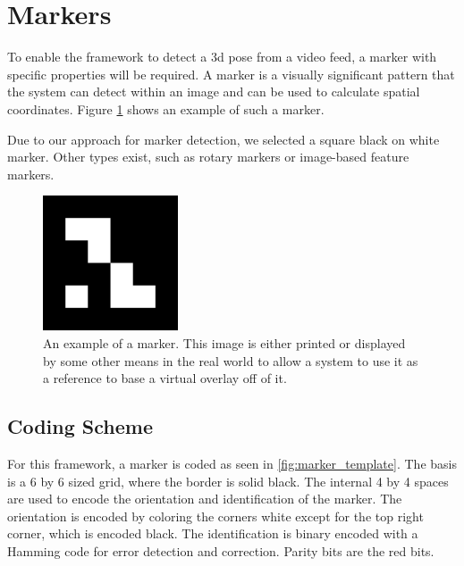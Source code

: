 \section{Markers}
\label{section_markers}

To enable the framework to detect a 3d pose from a video feed, a marker with specific properties will be required.
A marker is a visually significant pattern that the system can detect within an image and can be used to calculate spatial coordinates.
Figure \ref{fig:marker_example} shows an example of such a marker.

Due to our approach for marker detection, we selected a square black on white marker.
Other types exist, such as rotary markers or image-based feature markers.

\begin{figure}
	\centering
	\includegraphics[width=4cm]{img/marker_example.png}
	\caption[Example Marker.]{An example of a marker. This image is either printed or displayed by some other means in the real world to allow a system to use it as a reference to base a virtual overlay off of it.}
	\label{fig:marker_example}
\end{figure}

\subsection{Coding Scheme}

For this framework, a marker is coded as seen in \ref{fig:marker_template}.
The basis is a 6 by 6 sized grid, where the border is solid black.
The internal 4 by 4 spaces are used to encode the orientation and identification of the marker.
The orientation is encoded by coloring the corners white except for the top right corner, which is encoded black.
The identification is binary encoded with a Hamming code\cite{hamming} for error detection and correction.
Parity bits are the red bits.

